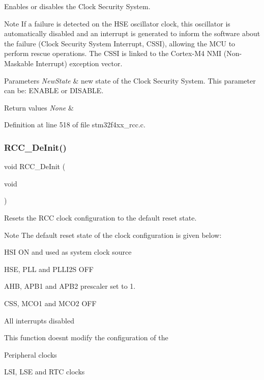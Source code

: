 Enables or disables the Clock Security System. 

\begin{DoxyNote}{Note}
If a failure is detected on the H\+SE oscillator clock, this oscillator is automatically disabled and an interrupt is generated to inform the software about the failure (Clock Security System Interrupt, C\+S\+SI), allowing the M\+CU to perform rescue operations. The C\+S\+SI is linked to the Cortex-\/\+M4 N\+MI (Non-\/\+Maskable Interrupt) exception vector. 
\end{DoxyNote}

\begin{DoxyParams}{Parameters}
{\em New\+State} & new state of the Clock Security System. This parameter can be\+: E\+N\+A\+B\+LE or D\+I\+S\+A\+B\+LE. \\
\hline
\end{DoxyParams}

\begin{DoxyRetVals}{Return values}
{\em None} & \\
\hline
\end{DoxyRetVals}


Definition at line 518 of file stm32f4xx\+\_\+rcc.\+c.

\mbox{\label{group___r_c_c_ga413f6422be11b1334abe60b3bff2e062}} 
\subsubsection{\texorpdfstring{R\+C\+C\+\_\+\+De\+Init()}{RCC\_DeInit()}}
{\footnotesize\ttfamily void R\+C\+C\+\_\+\+De\+Init (\begin{DoxyParamCaption}\item[{void}]{ }\end{DoxyParamCaption})}



Resets the R\+CC clock configuration to the default reset state. 

\begin{DoxyNote}{Note}
The default reset state of the clock configuration is given below\+:
\begin{DoxyItemize}
\item H\+SI ON and used as system clock source
\item H\+SE, P\+LL and P\+L\+L\+I2S O\+FF
\item A\+HB, A\+P\+B1 and A\+P\+B2 prescaler set to 1.
\item C\+SS, M\+C\+O1 and M\+C\+O2 O\+FF
\item All interrupts disabled 
\end{DoxyItemize}

This function doesn\textquotesingle{}t modify the configuration of the
\begin{DoxyItemize}
\item Peripheral clocks
\item L\+SI, L\+SE and R\+TC clocks 
\end{DoxyItemize}
\end{DoxyNote}

